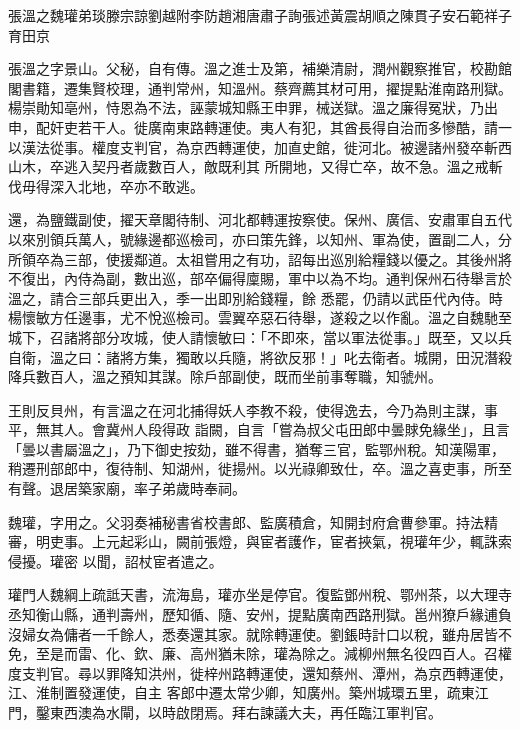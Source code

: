 
\begin{pinyinscope}

 張溫之魏瓘弟琰滕宗諒劉越附李防趙湘唐肅子詢張述黃震胡順之陳貫子安石範祥子育田京



 張溫之字景山。父秘，自有傳。溫之進士及第，補樂清尉，潤州觀察推官，校勘館閣書籍，遷集賢校理，通判常州，知溫州。蔡齊薦其材可用，擢提點淮南路刑獄。楊崇勛知亳州，恃恩為不法，誣蒙城知縣王申罪，械送獄。溫之廉得冤狀，乃出申，配奸吏若干人。徙廣南東路轉運使。夷人有犯，其酋長得自治而多慘酷，請一以漢法從事。權度支判官，為京西轉運使，加直史館，徙河北。被邊諸州發卒斬西山木，卒逃入契丹者歲數百人，敵既利其
 所開地，又得亡卒，故不急。溫之戒斬伐毋得深入北地，卒亦不敢逃。



 還，為鹽鐵副使，擢天章閣待制、河北都轉運按察使。保州、廣信、安肅軍自五代以來別領兵萬人，號緣邊都巡檢司，亦曰策先鋒，以知州、軍為使，置副二人，分所領卒為三部，使援鄰道。太祖嘗用之有功，詔每出巡別給糧錢以優之。其後州將不復出，內侍為副，數出巡，部卒偏得廩賜，軍中以為不均。通判保州石待舉言於溫之，請合三部兵更出入，季一出即別給錢糧，餘
 悉罷，仍請以武臣代內侍。時楊懷敏方任邊事，尤不悅巡檢司。雲翼卒惡石待舉，遂殺之以作亂。溫之自魏馳至城下，召諸將部分攻城，使人請懷敏曰：「不即來，當以軍法從事。」既至，又以兵自衛，溫之曰：諸將方集，獨敢以兵隨，將欲反邪！」叱去衛者。城開，田況潛殺降兵數百人，溫之預知其謀。除戶部副使，既而坐前事奪職，知虢州。



 王則反貝州，有言溫之在河北捕得妖人李教不殺，使得逸去，今乃為則主謀，事平，無其人。會冀州人段得政
 詣闕，自言「嘗為叔父屯田郎中曇賕免緣坐」，且言「曇以書屬溫之」，乃下御史按劾，雖不得書，猶奪三官，監鄂州稅。知漢陽軍，稍遷刑部郎中，復待制、知湖州，徙揚州。以光祿卿致仕，卒。溫之喜吏事，所至有聲。退居築家廟，率子弟歲時奉祠。



 魏瓘，字用之。父羽奏補秘書省校書郎、監廣積倉，知開封府倉曹參軍。持法精審，明吏事。上元起彩山，闕前張燈，與宦者護作，宦者挾氣，視瓘年少，輒誅索侵擾。瓘密
 以聞，詔杖宦者遣之。



 瓘門人魏綱上疏詆天書，流海島，瓘亦坐是停官。復監鄧州稅、鄂州茶，以大理寺丞知衡山縣，通判壽州，歷知循、隨、安州，提點廣南西路刑獄。邕州獠戶緣逋負沒婦女為傭者一千餘人，悉奏還其家。就除轉運使。劉鋹時計口以稅，雖舟居皆不免，至是而雷、化、欽、廉、高州猶未除，瓘為除之。減柳州無名役四百人。召權度支判官。尋以罪降知洪州，徙梓州路轉運使，還知蔡州、潭州，為京西轉運使，江、淮制置發運使，自主
 客郎中遷太常少卿，知廣州。築州城環五里，疏東江門，鑿東西澳為水閘，以時啟閉焉。拜右諫議大夫，再任臨江軍判官。




\end{pinyinscope}
